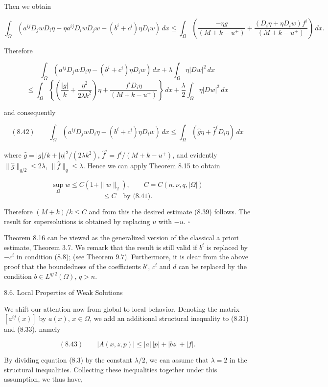 Then we obtain

\[
\int_{\Omega} (a^{ij}D_jwD_i\eta + \eta a^{ij}D_iwD_jw - (b^i+c^i)\eta D_iw)\,dx
\le \int_{\Omega} \left( \frac{-\eta g}{(M+k-u^+)} + \frac{(D_i\eta+\eta D_iw)f^i}{(M+k-u^+)} \right)\,dx.
\]

Therefore

\[
\int_{\Omega} (a^{ij}D_jwD_i\eta - (b^i+c^i)\eta D_iw)\,dx + \lambda \int_{\Omega} \eta |Dw|^2\,dx
\]
\[
\le \int_{\Omega} \left\{ \left( \frac{|g|}{k} + \frac{\eta^2}{2\lambda k^2} \right)\eta + \frac{f^iD_i\eta}{(M+k-u^+)} \right\}\,dx + \frac{\lambda}{2} \int_{\Omega} \eta |Dw|^2\,dx
\]

and consequently

\[
(8.42)\qquad \int_{\Omega} (a^{ij}D_jwD_i\eta - (b^i+c^i)\eta D_iw)\,dx \le \int_{\Omega} (\hat g\eta + \hat f^i D_i\eta)\,dx
\]

where $\hat g = |g|/k + |\eta|^2/(2\lambda k^2)$, $\hat f^i = f^i/(M+k-u^+)$, and evidently $\|\hat g\|_{q/2} \le 2\lambda$, $\|\hat f\|_{q} \le \lambda$.
Hence we can apply Theorem 8.15 to obtain

\[
\sup_{\Omega} w \le C(1+\|w\|_2),\qquad C = C(n,\nu,q,|\Omega|)
\]
\[
\le C \quad \text{by (8.41).}
\]

Therefore $(M+k)/k \le C$ and from this the desired estimate (8.39) follows. The
result for supersolutions is obtained by replacing $u$ with $-u$. $\square$

Theorem 8.16 can be viewed as the generalized version of the classical a priori
estimate, Theorem 3.7. We remark that the result is still valid if $b^i$ is replaced by
$-c^i$ in condition (8.8); (see Theorem 9.7). Furthermore, it is clear from the above
proof that the boundedness of the coefficients $b^i$, $c^i$ and $d$ can be replaced by the
condition $b \in L^{q/2}(\Omega)$, $q>n$.

\begin{flushleft}
8.6. Local Properties of Weak Solutions
\end{flushleft}

We shift our attention now from global to local behavior. Denoting the matrix
$[a^{ij}(x)]$ by $a(x)$, $x \in \Omega$, we add an additional structural inequality to (8.31) and
(8.33), namely

\[
(8.43)\qquad |A(x,z,p)|\leq |a|\,|p|+|bz|+|f|.
\]

By dividing equation (8.3) by the constant $\lambda/2$, we can assume that $\lambda=2$ in the
structural inequalities. Collecting these inequalities together under this assumption,
we thus have,

